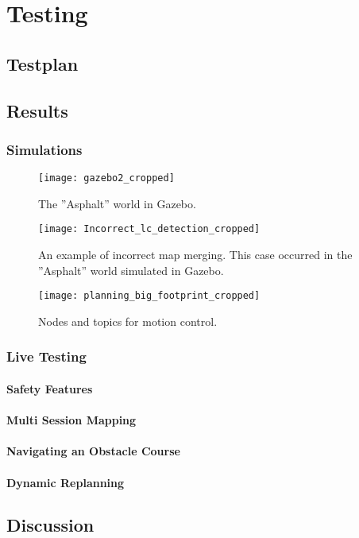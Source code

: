 \chapter{Testing}
\label{chp:testing} 

\section{Testplan}

\section{Results}

\subsection{Simulations}


\begin{figure}[p]
	\centering
	\texttt{[image: gazebo2\_cropped]}
	\caption{The ''Asphalt'' world in Gazebo. }
	\label{fig:Incorrect_lc_detection}
\end{figure}

\begin{figure}[p]
	\centering
	\texttt{[image: Incorrect\_lc\_detection\_cropped]}
	\caption{An example of incorrect map merging. This case occurred in the ''Asphalt'' world simulated in Gazebo.}
	\label{fig:Incorrect_lc_detection}
\end{figure}

\begin{figure}[p]
	\centering
	\texttt{[image: planning\_big\_footprint\_cropped]}
	\caption{Nodes and topics for motion control. }
	\label{fig:big_footprint}
\end{figure}

\subsection{Live Testing}

\subsubsection{Safety Features}

\subsubsection{Multi Session Mapping}

\subsubsection{Navigating an Obstacle Course}

\subsubsection{Dynamic Replanning}




\section{Discussion}